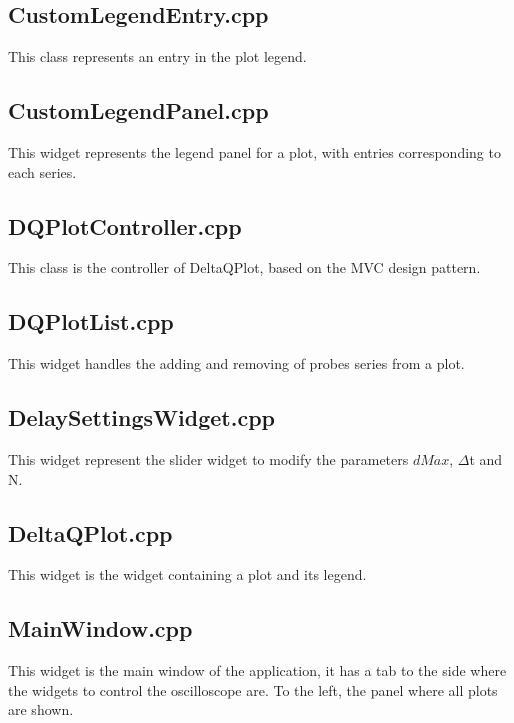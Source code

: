 \subsection{CustomLegendEntry.cpp} \label{code:cle}
This class represents an entry in the plot legend.


\subsection{CustomLegendPanel.cpp} \label{code:clp}
This widget represents the legend panel for a plot, with entries corresponding to each series.


\subsection{DQPlotController.cpp} \label{code:dqpc}
This class is the controller of DeltaQPlot, based on the MVC design pattern.


\subsection{DQPlotList.cpp} \label{code:dqpl}
This widget handles the adding and removing of probes series from a plot.


\subsection{DelaySettingsWidget.cpp} \label{code:dsw}
This widget represent the slider widget to modify the parameters $dMax$, $\Delta$t and N.


\subsection{DeltaQPlot.cpp} \label{code:dqp}
This widget is the widget containing a plot and its legend.


\subsection{MainWindow.cpp} \label{code:mw}
This widget is the main window of the application, it has a tab to the side where the widgets to control the oscilloscope are. To the left, the panel where all plots are shown.


